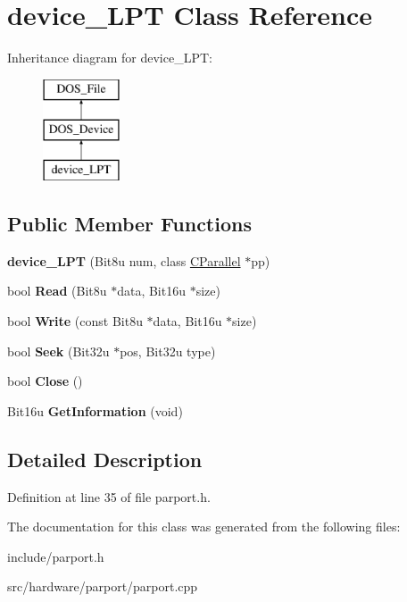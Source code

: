 \hypertarget{classdevice__LPT}{\section{device\-\_\-\-L\-P\-T Class Reference}
\label{classdevice__LPT}
}
Inheritance diagram for device\-\_\-\-L\-P\-T\-:\begin{figure}[H]
\begin{center}
\leavevmode
\includegraphics[height=3.000000cm]{classdevice__LPT}
\end{center}
\end{figure}
\subsection*{Public Member Functions}
\begin{DoxyCompactItemize}
\item 
\hypertarget{classdevice__LPT_a0fe0f1dcd98ebcc2d1338989f6cd8ce2}{{\bfseries device\-\_\-\-L\-P\-T} (Bit8u num, class \hyperlink{classCParallel}{C\-Parallel} $\ast$pp)}\label{classdevice__LPT_a0fe0f1dcd98ebcc2d1338989f6cd8ce2}

\item 
\hypertarget{classdevice__LPT_accdd4209aa20091bac0e7421b8bede4a}{bool {\bfseries Read} (Bit8u $\ast$data, Bit16u $\ast$size)}\label{classdevice__LPT_accdd4209aa20091bac0e7421b8bede4a}

\item 
\hypertarget{classdevice__LPT_abbc74ce5c3a56e96a25567b10bcae59e}{bool {\bfseries Write} (const Bit8u $\ast$data, Bit16u $\ast$size)}\label{classdevice__LPT_abbc74ce5c3a56e96a25567b10bcae59e}

\item 
\hypertarget{classdevice__LPT_abe09b700e40219a83df6970a4736646c}{bool {\bfseries Seek} (Bit32u $\ast$pos, Bit32u type)}\label{classdevice__LPT_abe09b700e40219a83df6970a4736646c}

\item 
\hypertarget{classdevice__LPT_a4b2fcab25e3e3b0a40e5ad7b4285147e}{bool {\bfseries Close} ()}\label{classdevice__LPT_a4b2fcab25e3e3b0a40e5ad7b4285147e}

\item 
\hypertarget{classdevice__LPT_a6ff3740aaab3006b025cc06bef4163fe}{Bit16u {\bfseries Get\-Information} (void)}\label{classdevice__LPT_a6ff3740aaab3006b025cc06bef4163fe}

\end{DoxyCompactItemize}


\subsection{Detailed Description}


Definition at line 35 of file parport.\-h.



The documentation for this class was generated from the following files\-:\begin{DoxyCompactItemize}
\item 
include/parport.\-h\item 
src/hardware/parport/parport.\-cpp\end{DoxyCompactItemize}
